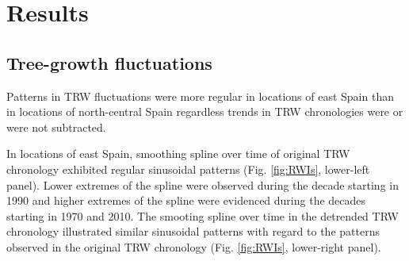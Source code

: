 \documentclass[review,authoryear]{elsarticle}
\begin{document}


\section{Results}

\subsection{Tree-growth fluctuations}
Patterns in \gls{TRW} fluctuations were more regular in locations
of east Spain than in locations of north-central Spain regardless
trends in \gls{TRW} chronologies were or were not subtracted.

In locations of east Spain, smoothing spline over time of original
\gls{TRW} chronology exhibited regular sinusoidal patterns
(Fig. \ref{fig:RWIs}, lower-left panel). Lower extremes of the spline
were observed during the decade starting in 1990 and higher extremes
of the spline were evidenced during the decades starting in 1970 and
2010. The smooting spline over time in the detrended \gls{TRW}
chronology illustrated similar sinusoidal patterns with regard to the
patterns observed in the original \gls{TRW} chronology
(Fig. \ref{fig:RWIs}, lower-right panel).
\end{document}
